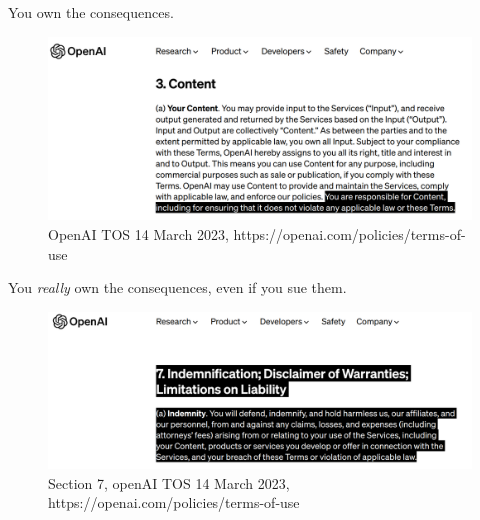 \documentclass[aspectratio=169]{beamer}
\begin{document}
\begin{frame}{You own the consequences.}
    \begin{figure}
        \centering
        \includegraphics[width=\textwidth]{Figures/responsible.png}
        \caption{OpenAI TOS 14 March 2023, https://openai.com/policies/terms-of-use}
        
    \end{figure}
\end{frame}
\begin{frame}{You \textit{really} own the consequences, even if you sue them.}
    \begin{figure}
        \centering
        \includegraphics[width=\textwidth]{Figures/openai-tos.png}
        \caption{Section 7, openAI TOS 14 March 2023, https://openai.com/policies/terms-of-use}
    \end{figure}
    
\end{frame}
\end{document}
